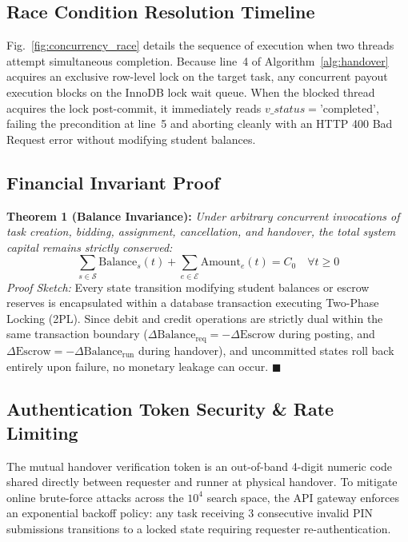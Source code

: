 \documentclass[conference]{IEEEtran}
\begin{document}
\subsection{Race Condition Resolution Timeline}
Fig.~\ref{fig:concurrency_race} details the sequence of execution when two threads attempt simultaneous completion. Because line~4 of Algorithm~\ref{alg:handover} acquires an exclusive row-level lock on the target task, any concurrent payout execution blocks on the InnoDB lock wait queue. When the blocked thread acquires the lock post-commit, it immediately reads $v\_status = \text{'completed'}$, failing the precondition at line~5 and aborting cleanly with an HTTP 400 Bad Request error without modifying student balances.

\subsection{Financial Invariant Proof}
\textbf{Theorem 1 (Balance Invariance):} \textit{Under arbitrary concurrent invocations of task creation, bidding, assignment, cancellation, and handover, the total system capital remains strictly conserved:}
\begin{equation}
    \sum_{s \in \mathcal{S}} \text{Balance}_s(t) + \sum_{e \in \mathcal{E}} \text{Amount}_e(t) = C_0 \quad \forall t \ge 0
\end{equation}
\textit{Proof Sketch:} Every state transition modifying student balances or escrow reserves is encapsulated within a database transaction executing Two-Phase Locking (2PL). Since debit and credit operations are strictly dual within the same transaction boundary ($\Delta \text{Balance}_{\text{req}} = -\Delta \text{Escrow}$ during posting, and $\Delta \text{Escrow} = -\Delta \text{Balance}_{\text{run}}$ during handover), and uncommitted states roll back entirely upon failure, no monetary leakage can occur. \hfill $\blacksquare$

\subsection{Authentication Token Security \& Rate Limiting}
The mutual handover verification token is an out-of-band 4-digit numeric code shared directly between requester and runner at physical handover. To mitigate online brute-force attacks across the $10^4$ search space, the API gateway enforces an exponential backoff policy: any task receiving 3 consecutive invalid PIN submissions transitions to a locked state requiring requester re-authentication.
\end{document}
